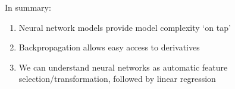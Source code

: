 In summary:
\vspace{1cm}
\pause{}
\begin{enumerate}
	\item Neural network models provide model complexity `on tap'\pause{}
	\item Backpropagation allows easy access to derivatives  \pause{}
	\item We can understand neural networks as automatic feature selection/transformation, followed by linear regression
\end{enumerate}
